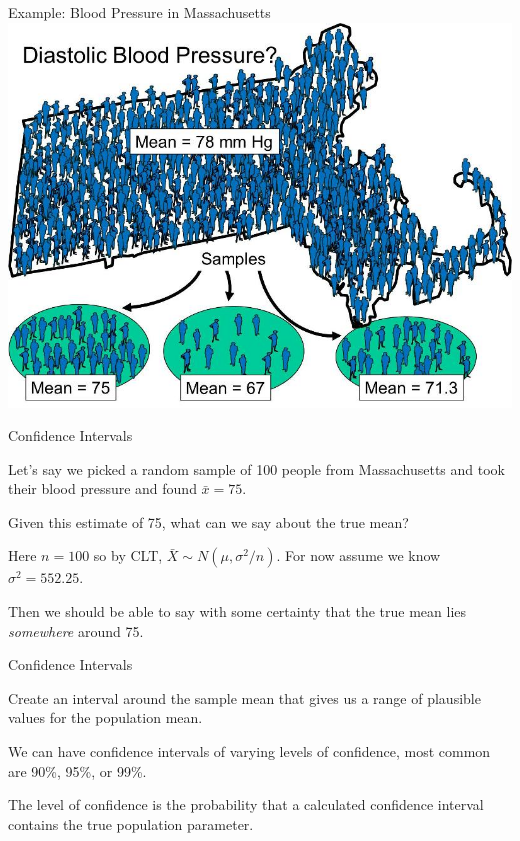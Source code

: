 \documentclass{./../div_teaching_slides}
\begin{document}
\begin{frame}{Example: Blood Pressure in Massachusetts}
\centering
\includegraphics[scale=0.35]{Sampling3.jpg}
\end{frame}

\begin{frame}{Confidence Intervals}
\begin{witemize}
	\item Let's say we picked a random sample of 100 people from Massachusetts and took their blood pressure and found $\bar{x} = 75$. 
  \item Given this estimate of 75, what can we say about the true mean?
  \item Here $n=100$ so by CLT, $\bar{X} \sim N(\mu, \sigma^2/n) $. For now assume we know $\sigma^2=552.25$.
  \item Then we should be able to say with some certainty that the true mean lies \textit{somewhere} around 75.
\end{witemize}
\end{frame}


\begin{frame}{Confidence Intervals}
\begin{witemize}
  \item Create an interval around the sample mean that gives us a range of plausible values for the population mean.
  \item We can have confidence intervals of varying levels of confidence, most common are 90\%, 95\%, or 99\%.
  \item The level of confidence is the probability that a calculated confidence interval contains the true population parameter. 
  \end{witemize}
\end{frame}
\end{document}
